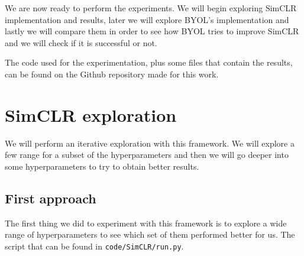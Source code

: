 We are now ready to perform the experiments. We will begin exploring SimCLR implementation and results, later we will explore BYOL's implementation and lastly we will compare them in order to see how BYOL tries to improve SimCLR and we will check if it is successful or not.

The code used for the experimentation, plus some files that contain the results, can be found on the Github repository made for this work.

\section{SimCLR exploration}
We will perform an iterative exploration with this framework. We will explore a few range for a subset of the hyperparameters and then we will go deeper into some hyperparameters to try to obtain better results.

\subsection{First approach}
\label{experiments:simclr:first}

The first thing we did to experiment with this framework is to explore a wide range of hyperparameters to see which set of them performed better for us. The script that can be found in \lstinline{code/SimCLR/run.py}.


